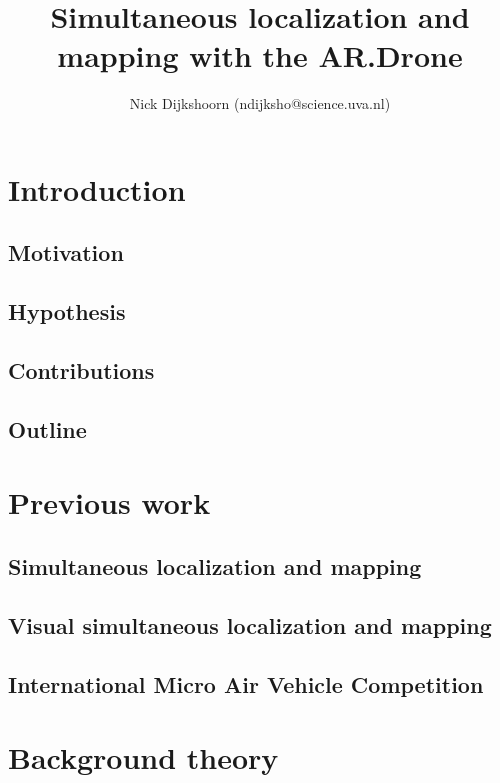 \documentclass[twoside]{uva-bachelor-thesis}
\title{Simultaneous localization and mapping with the AR.Drone}
\author{Nick Dijkshoorn (ndijksho@science.uva.nl)}
\begin{document}
\maketitle



\begin{abstract}

\end{abstract}

\tableofcontents

\setlength{\parindent}{0.0in}
\addtolength{\parskip}{\baselineskip}





\chapter{Introduction}
	\section{Motivation}
	\section{Hypothesis}
	\section{Contributions}
	\section{Outline}

\chapter{Previous work}
	\section{Simultaneous localization and mapping}
	\section{Visual simultaneous localization and mapping}
	\section{International Micro Air Vehicle Competition}

\chapter{Background theory}
\end{document}
